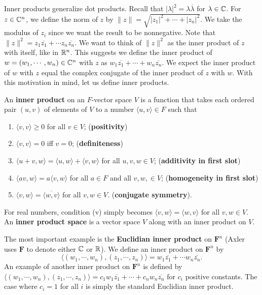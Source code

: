 Inner products generalize dot products. Recall that $|\lambda |^2=\lambda \overline{\lambda}$ for $\lambda \in \mathbb{C}$. For $z\in \mathbb{C}^n $, we define the norm of $z$ by $\|z\|=\sqrt{|z_1|^2+\cdots +|z_n |^2} $. We take the modulus of $z_i $ since we want the result to be nonnegative. Note that $\|z\|^2=z_1\overline{z_1}+\cdots z_n \overline{z_n }$. We want to think of $\|z\|^2$ as the inner product of $z$ with itself, like in $\mathbb{R}^n $. This suggests we define the inner product of $w=(w_1,\cdots ,w_n )\in \mathbb{C}^n $ with $z$ as $w_1\overline{z_1}+\cdots +w_n \overline{z_n }$. We expect the inner product of $w$ with $z$ equal the complex conjugate of the inner product of $z$ with $w$. With this motivation in mind, let us define inner products.
\begin{definition}
    An \textbf{inner product} on an $F$-vector space $V$ is a function that takes each ordered pair $(u,v)$ of elements of $V$ to a number $\langle u,v \rangle \in F$ such that
    \begin{enumerate}[label=(\roman*)]
        \item  $\langle v,v \rangle \geq 0$ for all $v\in V$; (\textbf{positivity})
        \item $\langle v,v \rangle =0$ iff $v=0$; (\textbf{definiteness})
        \item $\langle u+v,w \rangle =\langle u,w \rangle +\langle v,w \rangle $ for all $u,v,w\in V$; (\textbf{additivity in first slot})
        \item $\langle av,w \rangle =a\langle v,w \rangle $ for all $a\in F$ and all $v,w,\in V$; (\textbf{homogeneity in first slot})
        \item $\langle v,w\rangle= \overline{\langle w,v \rangle }  $ for all $v,w\in V$. (\textbf{conjugate symmetry}).
    \end{enumerate}
    For real numbers, condition (v) simply becomes $\langle v,w \rangle =\langle w,v \rangle $ for all  $v,w\in V$. An \textbf{inner product space} is a vector space $V$ along with an inner product on $V$.
\end{definition}
\begin{example}
    The most important example is the \textbf{Euclidian inner product} on $\mathbf F^n $ (Axler uses $\mathbf F$ to denote either $\mathbb{C}$ or $\mathbb{R}$). We define an inner product on $\mathbf F^n $ by \[
        \langle (w_1,\cdots ,w_n ),(z_1,\cdots ,z_n ) \rangle =w_1\overline{z_1}+\cdots w_n \overline{z_n }.
    \] An example of another inner product on $\mathbf F^n $ is defined by $\langle (w_1,\cdots ,w_n ),(z_1,\cdots ,z_n ) \rangle =c_1w_1\overline{z_1}+\cdots +c_n w_n \overline{z_n }$ for $c_i $ positive constants. The case where $c_i =1$ for all $i$ is simply the standard Euclidian inner product.
\end{example}
